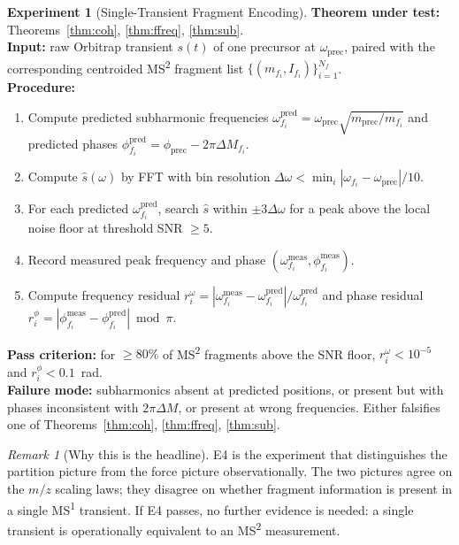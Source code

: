 \documentclass[twocolumn,10pt,a4paper]{article}
\theoremstyle{thmstyle}
\theoremstyle{definition}
\newtheorem{experiment}[theorem]{Experiment}
\theoremstyle{remark}
\newtheorem{remark}[theorem]{Remark}
\begin{document}
\begin{experiment}[Single-Transient Fragment Encoding]
\label{exp:e4}
\textbf{Theorem under test:} Theorems~\ref{thm:coh},
\ref{thm:ffreq}, \ref{thm:sub}.\\
\textbf{Input:} raw Orbitrap transient $s(t)$ of one precursor at
$\omega_{\mathrm{prec}}$, paired with the corresponding centroided
MS\textsuperscript{2} fragment list
$\{(m_{f_{i}},I_{f_{i}})\}_{i=1}^{N_{f}}$.\\
\textbf{Procedure:}
\begin{enumerate}[nosep,leftmargin=*]
\item Compute predicted subharmonic frequencies
$\omega_{f_{i}}^{\mathrm{pred}}=\omega_{\mathrm{prec}}\sqrt{m_{\mathrm{prec}}/m_{f_{i}}}$
and predicted phases
$\phi_{f_{i}}^{\mathrm{pred}}=\phi_{\mathrm{prec}}-2\pi\Delta M_{f_{i}}$.
\item Compute $\hat s(\omega)$ by FFT with bin resolution
$\Delta\omega<\min_{i}|\omega_{f_{i}}-\omega_{\mathrm{prec}}|/10$.
\item For each predicted $\omega_{f_{i}}^{\mathrm{pred}}$, search
$\hat s$ within $\pm 3\Delta\omega$ for a peak above the local noise
floor at threshold SNR $\geq 5$.
\item Record measured peak frequency and phase
$(\omega_{f_{i}}^{\mathrm{meas}},\phi_{f_{i}}^{\mathrm{meas}})$.
\item Compute frequency residual
$r_{i}^{\omega}=|\omega_{f_{i}}^{\mathrm{meas}}-\omega_{f_{i}}^{\mathrm{pred}}|/\omega_{f_{i}}^{\mathrm{pred}}$
and phase residual
$r_{i}^{\phi}=|\phi_{f_{i}}^{\mathrm{meas}}-\phi_{f_{i}}^{\mathrm{pred}}|\bmod\pi$.
\end{enumerate}
\textbf{Pass criterion:} for $\geq 80\%$ of MS\textsuperscript{2}
fragments above the SNR floor,
$r_{i}^{\omega}<10^{-5}$ and $r_{i}^{\phi}<0.1$~rad.\\
\textbf{Failure mode:} subharmonics absent at predicted positions,
or present but with phases inconsistent with $2\pi\Delta M$, or
present at wrong frequencies. Either falsifies one of
Theorems~\ref{thm:coh}, \ref{thm:ffreq}, \ref{thm:sub}.
\end{experiment}

\begin{remark}[Why this is the headline]
E4 is the experiment that distinguishes the partition picture from
the force picture observationally. The two pictures agree on the
$m/z$ scaling laws; they disagree on whether fragment information is
present in a single MS\textsuperscript{1} transient. If E4 passes,
no further evidence is needed: a single transient is operationally
equivalent to an MS\textsuperscript{2} measurement.
\end{remark}
\end{document}
